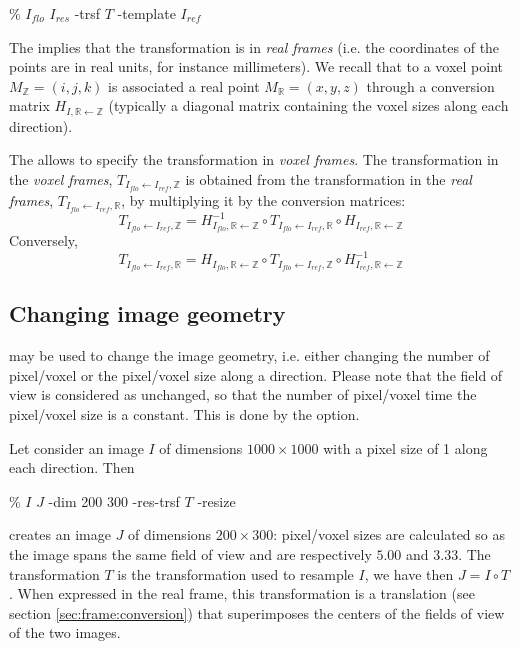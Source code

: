 \begin{code}{0.8}
\% \applyTrsf $I_{flo}$ $I_{res}$ -trsf $T$ -template $I_{ref}$
\end{code}

The  implies that the transformation is in \textit{real frames} (i.e. the coordinates of the points are in real units, for instance millimeters). We recall that to a voxel point $M_{\mathbb{Z}} = (i,j,k)$ is associated a real point $M_{\mathbb{R}} = (x,y,z)$ through a conversion matrix $H_{I,\mathbb{R} \leftarrow \mathbb{Z}}$ (typically a diagonal matrix containing the voxel sizes along each direction).

The  allows to specify the transformation in \textit{voxel frames}. The transformation in the \textit{voxel frames}, $T_{I_{flo} \leftarrow I_{ref}, \mathbb{Z}}$ is obtained from the transformation in the \textit{real frames}, $T_{I_{flo} \leftarrow I_{ref}, \mathbb{R}}$, by multiplying it by the conversion matrices:
$$
T_{I_{flo} \leftarrow I_{ref}, \mathbb{Z}} 
=
H^{-1}_{I_{flo},\mathbb{R} \leftarrow \mathbb{Z}} \circ
T_{I_{flo} \leftarrow I_{ref}, \mathbb{R}} \circ
H_{I_{ref},\mathbb{R} \leftarrow \mathbb{Z}}
$$
Conversely,
$$
T_{I_{flo} \leftarrow I_{ref}, \mathbb{R}} 
=
H_{I_{flo},\mathbb{R} \leftarrow \mathbb{Z}} \circ
T_{I_{flo} \leftarrow I_{ref}, \mathbb{Z}} \circ
H^{-1}_{I_{ref},\mathbb{R} \leftarrow \mathbb{Z}}
$$


\subsection{Changing image geometry}
\label{sec:changing:image:geometry}

\applyTrsf may be used to change the image geometry, i.e. either changing the number of pixel/voxel or the pixel/voxel size along a direction. Please note that the field of view is considered as unchanged, so that the number of pixel/voxel time the pixel/voxel size is a constant. This is done by the  option.

Let consider an image $I$ of dimensions $1000 \times 1000$ with a pixel size of 1 along each direction. Then
\begin{code}{0.8}
\% \applyTrsf $I$ $J$ -dim 200 300 -res-trsf $T$ -resize
\end{code}
creates an image $J$  of dimensions $200 \times 300$: pixel/voxel sizes are calculated so as the image spans the same field of view and are respectively $5.00$ and $3.33$. The transformation $T$ is the transformation used to resample $I$, we have then $J = I \circ T$. When expressed in the real frame, this transformation is a translation (see section \ref{sec:frame:conversion}) that superimposes the centers of the fields of view of the two images.

